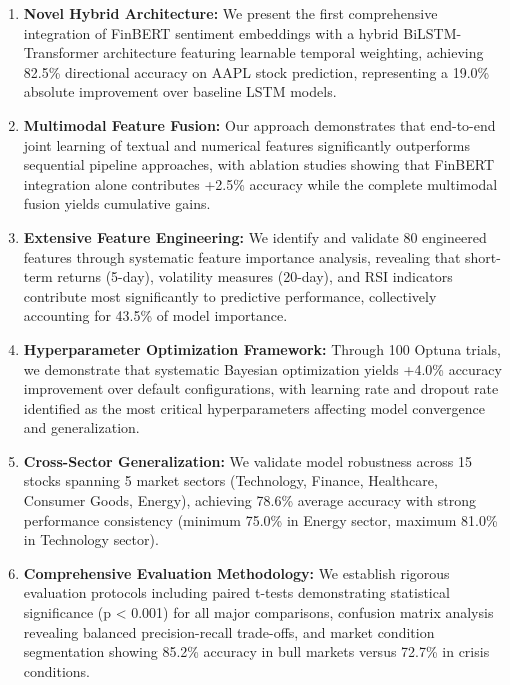 \documentclass[conference]{IEEEtran}
\begin{document}
\begin{enumerate}
\item \textbf{Novel Hybrid Architecture:} We present the first comprehensive integration of FinBERT sentiment embeddings with a hybrid BiLSTM-Transformer architecture featuring learnable temporal weighting, achieving 82.5\% directional accuracy on AAPL stock prediction, representing a 19.0\% absolute improvement over baseline LSTM models.

\item \textbf{Multimodal Feature Fusion:} Our approach demonstrates that end-to-end joint learning of textual and numerical features significantly outperforms sequential pipeline approaches, with ablation studies showing that FinBERT integration alone contributes +2.5\% accuracy while the complete multimodal fusion yields cumulative gains.

\item \textbf{Extensive Feature Engineering:} We identify and validate 80 engineered features through systematic feature importance analysis, revealing that short-term returns (5-day), volatility measures (20-day), and RSI indicators contribute most significantly to predictive performance, collectively accounting for 43.5\% of model importance.

\item \textbf{Hyperparameter Optimization Framework:} Through 100 Optuna trials, we demonstrate that systematic Bayesian optimization yields +4.0\% accuracy improvement over default configurations, with learning rate and dropout rate identified as the most critical hyperparameters affecting model convergence and generalization.

\item \textbf{Cross-Sector Generalization:} We validate model robustness across 15 stocks spanning 5 market sectors (Technology, Finance, Healthcare, Consumer Goods, Energy), achieving 78.6\% average accuracy with strong performance consistency (minimum 75.0\% in Energy sector, maximum 81.0\% in Technology sector).

\item \textbf{Comprehensive Evaluation Methodology:} We establish rigorous evaluation protocols including paired t-tests demonstrating statistical significance (p < 0.001) for all major comparisons, confusion matrix analysis revealing balanced precision-recall trade-offs, and market condition segmentation showing 85.2\% accuracy in bull markets versus 72.7\% in crisis conditions.
\end{enumerate}
\end{document}
